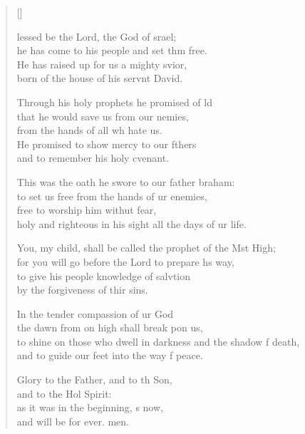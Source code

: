 \settowidth{\versewidth}{to shine on those who dwell in darkness and the shadow of death, *}
\begin{verse}[\versewidth]
  \begin{patverse}
lessed be the Lord, the God of srael;\Med\\
he has come to his people and set thm free.\\
He has raised up for us a mighty svior,\Med\\
born of the house of his servnt David.

Through his holy prophets he promised of ld\Flex\\
that he would save us from our nemies,\Med\\
from the hands of all wh hate us.\\
He promised to show mercy to our fthers\Med\\
and to remember his holy cvenant.

This was the oath he swore to our father braham:\Med\\
to set us free from the hands of ur enemies,\\
free to worship him withut fear,\Med\\
holy and righteous in his sight all the days of ur life.

You, my child, shall be called the prophet of the Mst High;\Med\\
for you will go before the Lord to prepare h\pointup{\i}s way,\\
to give his people knowledge of salvtion\Med\\
by the forgiveness of thir sins.

In the tender compassion of ur God\Med\\
the dawn from on high shall break pon us,\\
to shine on those who dwell in darkness and the shadow f death,\Med\\
and to guide our feet into the way f peace.

Glory to the Father, and to th Son,\Med\\
and to the Hol Spirit:\\
as it was in the beginning, \pointup{\i}s now,\Med\\
and will be for ever. men.
  \end{patverse}
  \end{verse}
